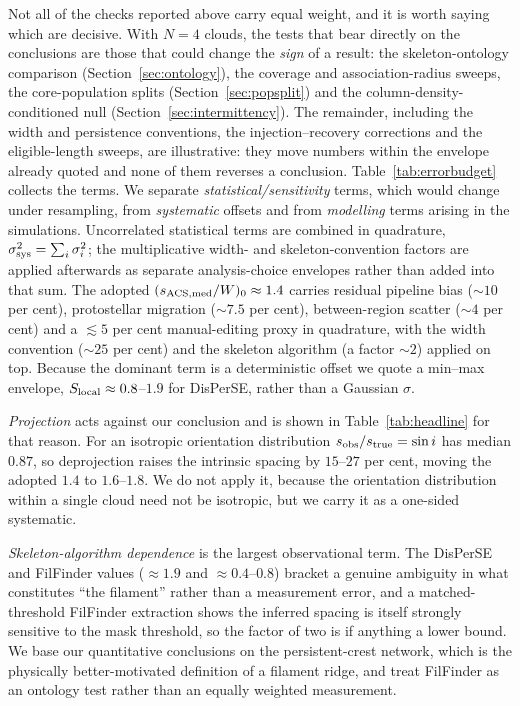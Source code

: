 \documentclass[usenatbib,twoside,twocolumn]{mnras}
\begin{document}
Not all of the checks reported above carry equal weight, and it is worth saying which are decisive. With $N=4$ clouds, the tests that bear directly on the conclusions are those that could change the \emph{sign} of a result: the skeleton-ontology comparison (Section~\ref{sec:ontology}), the coverage and association-radius sweeps, the core-population splits (Section~\ref{sec:popsplit}) and the column-density-conditioned null (Section~\ref{sec:intermittency}). The remainder, including the width and persistence conventions, the injection--recovery corrections and the eligible-length sweeps, are illustrative: they move numbers within the envelope already quoted and none of them reverses a conclusion. Table~\ref{tab:errorbudget} collects the terms. We separate \emph{statistical/sensitivity} terms, which would change under resampling, from \emph{systematic} offsets and from \emph{modelling} terms arising in the simulations. Uncorrelated statistical terms are combined in quadrature, $\sigma_{\rm sys}^2=\sum_i\sigma_i^2$; the multiplicative width- and skeleton-convention factors are applied afterwards as separate analysis-choice envelopes rather than added into that sum. The adopted $(s_{\rm ACS,med}/W)_0\approx1.4$ carries residual pipeline bias ($\sim10$ per cent), protostellar migration ($\sim7.5$ per cent), between-region scatter ($\sim4$ per cent) and a $\lesssim5$ per cent manual-editing proxy in quadrature, with the width convention ($\sim25$ per cent) and the skeleton algorithm (a factor $\sim2$) applied on top. Because the dominant term is a deterministic offset we quote a min--max envelope, $S_{\rm local}\approx0.8$--$1.9$ for DisPerSE, rather than a Gaussian $\sigma$.

\emph{Projection} acts against our conclusion and is shown in Table~\ref{tab:headline} for that reason. For an isotropic orientation distribution $s_{\rm obs}/s_{\rm true}=\sin i$ has median $0.87$, so deprojection raises the intrinsic spacing by $15$--$27$ per cent, moving the adopted $1.4$ to $1.6$--$1.8$. We do not apply it, because the orientation distribution within a single cloud need not be isotropic, but we carry it as a one-sided systematic.

\emph{Skeleton-algorithm dependence} is the largest observational term. The DisPerSE and FilFinder values ($\approx1.9$ and $\approx0.4$--$0.8$) bracket a genuine ambiguity in what constitutes ``the filament'' rather than a measurement error, and a matched-threshold FilFinder extraction shows the inferred spacing is itself strongly sensitive to the mask threshold, so the factor of two is if anything a lower bound. We base our quantitative conclusions on the persistent-crest network, which is the physically better-motivated definition of a filament ridge, and treat FilFinder as an ontology test rather than an equally weighted measurement.
\end{document}
